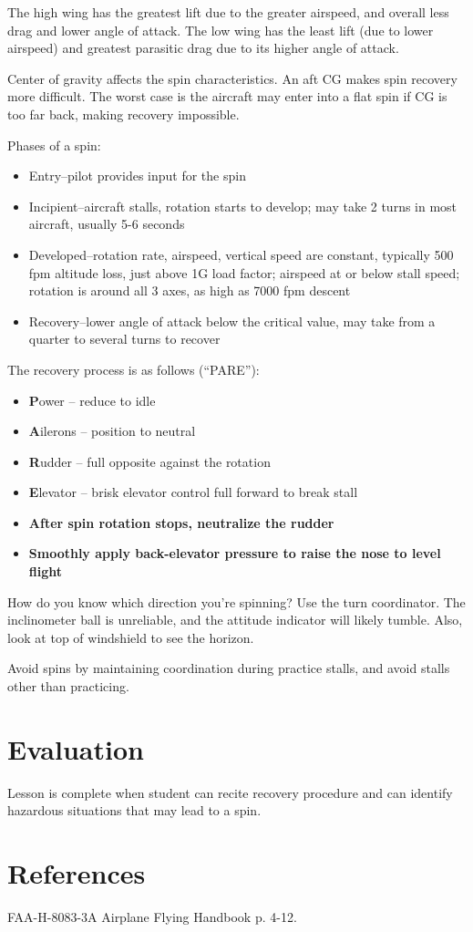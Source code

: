 The high wing has the greatest lift due to the greater airspeed, and overall
less drag and lower angle of attack. The low wing has the least lift (due to
lower airspeed) and greatest parasitic drag due to its higher angle of attack.

Center of gravity affects the spin characteristics. An aft CG makes spin
recovery more difficult. The worst case is the aircraft may enter into a flat
spin if CG is too far back, making recovery impossible.

Phases of a spin:
\begin{itemize}
  \item Entry--pilot provides input for the spin
  \item Incipient--aircraft stalls, rotation starts to develop; may take 2
    turns in most aircraft, usually 5-6 seconds
  \item Developed--rotation rate, airspeed, vertical speed are constant,
    typically 500 fpm altitude loss, just above 1G load factor; airspeed at or
    below stall speed; rotation is around all 3 axes, as high as 7000 fpm
    descent
  \item Recovery--lower angle of attack below the critical value, may take from a
    quarter to several turns to recover
\end{itemize}

The recovery process is as follows (``PARE''):
\begin{itemize}
  \item \textbf{P}ower -- reduce to idle
  \item \textbf{A}ilerons -- position to neutral
  \item \textbf{R}udder -- full opposite against the rotation
  \item \textbf{E}levator -- brisk elevator control full forward to break stall
  \item \textbf{After spin rotation stops, neutralize the rudder}
  \item \textbf{Smoothly apply back-elevator pressure to raise the nose to
    level flight}
\end{itemize}

How do you know which direction you're spinning? Use the turn coordinator. The
inclinometer ball is unreliable, and the attitude indicator will likely tumble.
Also, look at top of windshield to see the horizon.

Avoid spins by maintaining coordination during practice stalls, and avoid
stalls other than practicing.

\section{Evaluation}

Lesson is complete when student can recite recovery procedure and can identify
hazardous situations that may lead to a spin.

\section{References}

FAA-H-8083-3A Airplane Flying Handbook p. 4-12.


